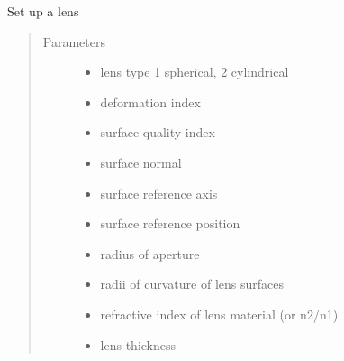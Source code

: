 \documentclass[letterpaper,10pt,english]{sphinxmanual}
\begin{document}
\begin{fulllineitems}
\begin{description}
\end{description}

\end{fulllineitems}


\begin{fulllineitems}
\label{\detokenize{xsrt_functions:xsrt.lens}}
Set up a lens
\begin{quote}\begin{description}
\item[{Parameters}] \leavevmode\begin{itemize}
\item {} 
 \textendash{} lens type 1 spherical, 2 cylindrical

\item {} 
 \textendash{} deformation index

\item {} 
 \textendash{} surface quality index

\item {} 
 \textendash{} surface normal

\item {} 
 \textendash{} surface reference axis

\item {} 
 \textendash{} surface reference position

\item {} 
 \textendash{} radius of aperture

\item {} 
\sphinxstyleliteralstrong{\sphinxupquote{,}} \textendash{} radii of curvature of lens surfaces

\item {} 
 \textendash{} refractive index of lens material (or n2/n1)

\item {} 
 \textendash{} lens thickness


\end{itemize}
\end{description}
\end{quote}
\end{fulllineitems}
\end{document}
